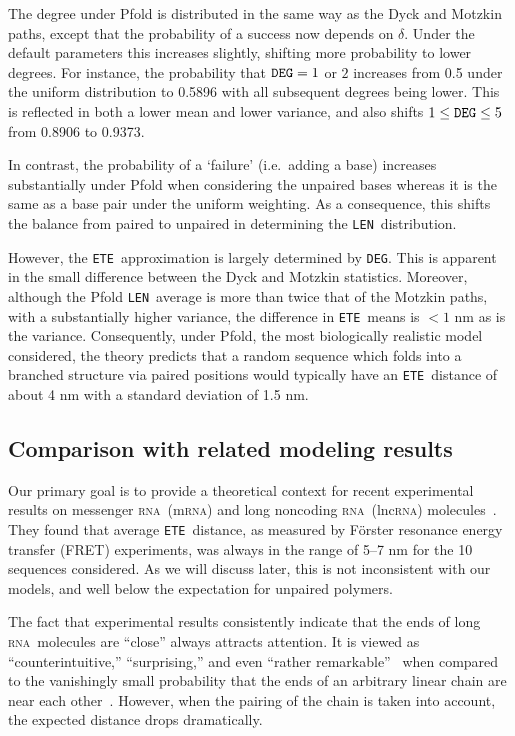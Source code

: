 \documentclass{article}
\newcommand{\RNA}{\textsc{rna}}
\newcommand{\DEG}{{\tt DEG}}
\newcommand{\ETE}{{\tt ETE}}
\newcommand{\LEN}{{\tt LEN}}
\begin{document}
The degree under Pfold is distributed in the same way as the Dyck and Motzkin paths,
except that the probability of a success now depends on $\delta$.
Under the default parameters this increases slightly, shifting more
probability to lower degrees.
For instance, the probability that $\DEG = 1$ or $2$ increases from 0.5
under the uniform distribution to 0.5896 with all subsequent degrees
being lower.
This is reflected in both a lower mean and lower variance, and also
shifts $1 \leq \DEG \leq 5$ from 0.8906 to 0.9373.

In contrast, the probability of a `failure' (i.e.\ adding a base) 
increases substantially under Pfold when considering the unpaired bases 
whereas it is the same as a base pair under the uniform weighting.
As a consequence, this shifts the balance from paired to unpaired
in determining the \LEN\ distribution.

However, the \ETE\ approximation is largely determined by \DEG.
This is apparent in the small difference between the Dyck and Motzkin
statistics.
Moreover, although the Pfold \LEN\ average is more than twice that
of the Motzkin paths, with a substantially higher variance,
the difference in \ETE\ means is $< 1$ nm as is the variance.
Consequently, under Pfold, the most biologically realistic model considered,
the theory predicts that a random sequence which folds into a 
branched structure via paired positions would typically have an \ETE\ 
distance of about 4 nm with a standard deviation of 1.5 nm.

\subsection{Comparison with related modeling results}

Our primary goal is to provide a theoretical context for recent 
experimental results on messenger \RNA\ (m\RNA) and long noncoding \RNA\ 
(lnc\RNA) molecules~\cite{Lai:2018}.
They found that average \ETE\ distance,  
as measured by F\"orster resonance energy transfer (FRET) experiments,
was always in the range of 5--7 nm for the 10 sequences considered.
As we will discuss later,
this is not inconsistent with our models, and well below the 
expectation for unpaired polymers.

The fact that experimental results consistently indicate that
the ends of long \RNA\ molecules are ``close'' always attracts 
attention.
It is viewed as ``counterintuitive,''
``surprising,'' and even ``rather remarkable''~\cite{Ermolenko:2020}
when compared to the vanishingly small probability that the ends of an
arbitrary linear chain are near each other~\cite{Yoffe:2010}.
However, when the pairing of the chain is taken into account, 
the expected distance drops dramatically.
\end{document}
